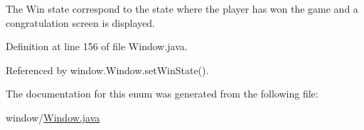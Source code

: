 The Win state correspond to the state where the player has won the game and a congratulation screen is displayed. 



Definition at line 156 of file Window.\-java.



Referenced by window.\-Window.\-set\-Win\-State().



The documentation for this enum was generated from the following file\-:\begin{DoxyCompactItemize}
\item 
window/\hyperlink{a00057}{Window.\-java}\end{DoxyCompactItemize}
